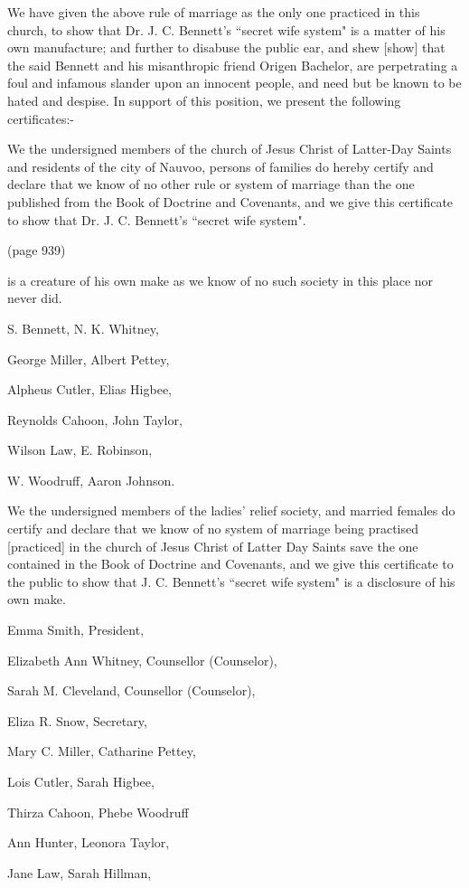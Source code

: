 We have given the above rule of marriage as the only one practiced in this church, to
show that Dr. J. C. Bennett's ``secret wife system" is a matter of his own
manufacture; and further to disabuse the public ear, and shew [show] that the said
Bennett and his misanthropic friend Origen Bachelor, are perpetrating a foul and
infamous slander upon an innocent people, and need but be known to be hated and
despise. In support of this position, we present the following certificates:-

We the undersigned members of the church of Jesus Christ of Latter-Day Saints and
residents of the city of Nauvoo, persons of families do hereby certify and declare
that we know of no other rule or system of marriage than the one published from the
Book of Doctrine and Covenants, and we give this certificate to show that Dr. J. C.
Bennett's ``secret wife system".

(page 939)

is a creature of his own make as we know of no such society in this place nor never 
did.

S. Bennett, N. K. Whitney,

George Miller, Albert Pettey,

Alpheus Cutler, Elias Higbee,

Reynolds Cahoon, John Taylor,

Wilson Law, E. Robinson,

W. Woodruff, Aaron Johnson.

We the undersigned members of the ladies' relief society, and married females do
certify and declare that we know of no system of marriage being practised [practiced]
in the church of Jesus Christ of Latter Day Saints save the one contained in the Book
of Doctrine and Covenants, and we give this certificate to the public to show that J.
C. Bennett's ``secret wife system" is a disclosure of his own make.

Emma Smith, President,

Elizabeth Ann Whitney, Counsellor (Counselor),

Sarah M. Cleveland, Counsellor (Counselor),

Eliza R. Snow, Secretary,

Mary C. Miller, Catharine Pettey,

Lois Cutler, Sarah Higbee,

Thirza Cahoon, Phebe Woodruff

Ann Hunter, Leonora Taylor,

Jane Law, Sarah Hillman,

